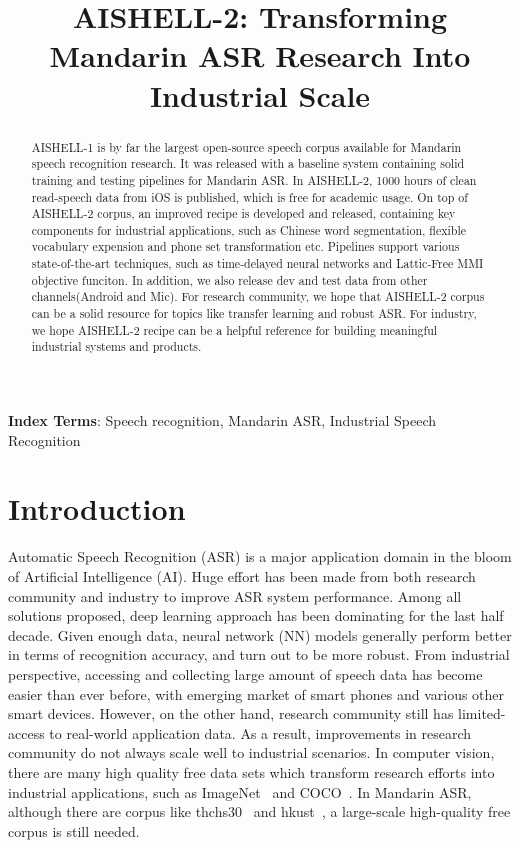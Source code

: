 \documentclass[a4paper]{article}
\title{AISHELL-2: Transforming Mandarin ASR Research Into Industrial Scale}
\begin{document}
\maketitle
%
\begin{abstract}
AISHELL-1 is by far the largest open-source speech corpus available for Mandarin
speech recognition research. It was released with a baseline system containing solid
training and testing pipelines for Mandarin ASR. In AISHELL-2, 1000 hours of
clean read-speech data from iOS is published, which is free for academic usage. On top of
AISHELL-2 corpus, an improved recipe is developed and released, containing key
components for industrial applications, such as Chinese word segmentation,
flexible vocabulary expension and phone set transformation etc. 
Pipelines support various state-of-the-art techniques, such
as time-delayed neural networks and Lattic-Free MMI objective funciton. 
In addition, we also release dev and test data from other channels(Android and Mic). 
For research community, we hope that AISHELL-2
corpus can be a solid resource for topics like transfer learning and robust
ASR. For industry, we hope AISHELL-2 recipe can be a helpful reference for
building meaningful industrial systems and products.
\end{abstract}
\noindent\textbf{Index Terms}: Speech recognition, Mandarin ASR, Industrial Speech Recognition

\section{Introduction}

Automatic Speech Recognition (ASR) is a major application domain in the bloom of Artificial
Intelligence (AI). Huge effort has been made from both research community and industry to improve ASR system performance. Among all solutions proposed, deep learning approach has been dominating for the last half decade. Given enough data, neural network (NN) models generally perform better in terms of recognition accuracy, and turn out to be more robust.
From industrial perspective, accessing and collecting large amount of speech data has become easier than ever before, with emerging market of smart phones and various other smart devices.
However, on the other hand, research community still has limited-access to real-world application data. As a result, improvements in research community do not always scale well to industrial scenarios. 
In computer vision, there are many high quality free data sets which transform research efforts into industrial applications, such as ImageNet~\cite{imagenet} and COCO~\cite{coco}. 
In Mandarin ASR, although there are corpus like thchs30~\cite{thchs30} and hkust~\cite{hkust1}, a large-scale high-quality free corpus is still needed.
\end{document}
